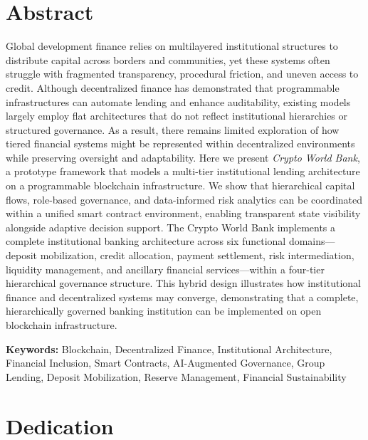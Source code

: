 \documentclass[12pt,a4paper]{report}
\begin{document}
\chapter*{Abstract}
{}

Global development finance relies on multilayered institutional structures to distribute capital across borders and communities, yet these systems often struggle with fragmented transparency, procedural friction, and uneven access to credit. Although decentralized finance has demonstrated that programmable infrastructures can automate lending and enhance auditability, existing models largely employ flat architectures that do not reflect institutional hierarchies or structured governance. As a result, there remains limited exploration of how tiered financial systems might be represented within decentralized environments while preserving oversight and adaptability. Here we present \textit{Crypto World Bank}, a prototype framework that models a multi-tier institutional lending architecture on a programmable blockchain infrastructure. We show that hierarchical capital flows, role-based governance, and data-informed risk analytics can be coordinated within a unified smart contract environment, enabling transparent state visibility alongside adaptive decision support. The Crypto World Bank implements a complete institutional banking architecture across six functional domains---deposit mobilization, credit allocation, payment settlement, risk intermediation, liquidity management, and ancillary financial services---within a four-tier hierarchical governance structure. This hybrid design illustrates how institutional finance and decentralized systems may converge, demonstrating that a complete, hierarchically governed banking institution can be implemented on open blockchain infrastructure.

\vspace{0.5em}
\noindent\textbf{Keywords:} Blockchain, Decentralized Finance, Institutional Architecture, Financial Inclusion, Smart Contracts, AI-Augmented Governance, Group Lending, Deposit Mobilization, Reserve Management, Financial Sustainability

\newpage
\thispagestyle{empty}

\chapter*{Dedication}
{}
\end{document}
